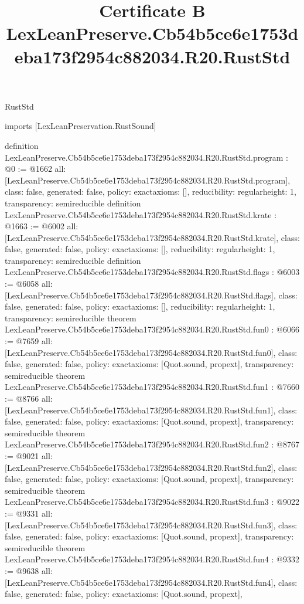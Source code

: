 \begin{lexlean}{RustStd}
\title{Certificate B LexLeanPreserve.Cb54b5ce6e1753deba173f2954c882034.R20.RustStd}
\begin{coremodule}
imports [LexLeanPreservation.RustSound]

definition LexLeanPreserve.Cb54b5ce6e1753deba173f2954c882034.R20.RustStd.program : @0 := @1662 {
  all: [LexLeanPreserve.Cb54b5ce6e1753deba173f2954c882034.R20.RustStd.program],
  class: false,
  generated: false,
  policy: exact{axioms: []},
  reducibility: regular{height: 1},
  transparency: semireducible
}
definition LexLeanPreserve.Cb54b5ce6e1753deba173f2954c882034.R20.RustStd.krate : @1663 := @6002 {
  all: [LexLeanPreserve.Cb54b5ce6e1753deba173f2954c882034.R20.RustStd.krate],
  class: false,
  generated: false,
  policy: exact{axioms: []},
  reducibility: regular{height: 1},
  transparency: semireducible
}
definition LexLeanPreserve.Cb54b5ce6e1753deba173f2954c882034.R20.RustStd.flags : @6003 := @6058 {
  all: [LexLeanPreserve.Cb54b5ce6e1753deba173f2954c882034.R20.RustStd.flags],
  class: false,
  generated: false,
  policy: exact{axioms: []},
  reducibility: regular{height: 1},
  transparency: semireducible
}
theorem LexLeanPreserve.Cb54b5ce6e1753deba173f2954c882034.R20.RustStd.fun0 : @6066 := @7659 {
  all: [LexLeanPreserve.Cb54b5ce6e1753deba173f2954c882034.R20.RustStd.fun0],
  class: false,
  generated: false,
  policy: exact{axioms: [Quot.sound, propext]},
  transparency: semireducible
}
theorem LexLeanPreserve.Cb54b5ce6e1753deba173f2954c882034.R20.RustStd.fun1 : @7660 := @8766 {
  all: [LexLeanPreserve.Cb54b5ce6e1753deba173f2954c882034.R20.RustStd.fun1],
  class: false,
  generated: false,
  policy: exact{axioms: [Quot.sound, propext]},
  transparency: semireducible
}
theorem LexLeanPreserve.Cb54b5ce6e1753deba173f2954c882034.R20.RustStd.fun2 : @8767 := @9021 {
  all: [LexLeanPreserve.Cb54b5ce6e1753deba173f2954c882034.R20.RustStd.fun2],
  class: false,
  generated: false,
  policy: exact{axioms: [Quot.sound, propext]},
  transparency: semireducible
}
theorem LexLeanPreserve.Cb54b5ce6e1753deba173f2954c882034.R20.RustStd.fun3 : @9022 := @9331 {
  all: [LexLeanPreserve.Cb54b5ce6e1753deba173f2954c882034.R20.RustStd.fun3],
  class: false,
  generated: false,
  policy: exact{axioms: [Quot.sound, propext]},
  transparency: semireducible
}
theorem LexLeanPreserve.Cb54b5ce6e1753deba173f2954c882034.R20.RustStd.fun4 : @9332 := @9638 {
  all: [LexLeanPreserve.Cb54b5ce6e1753deba173f2954c882034.R20.RustStd.fun4],
  class: false,
  generated: false,
  policy: exact{axioms: [Quot.sound, propext]},
}
\end{coremodule}
\end{lexlean}
